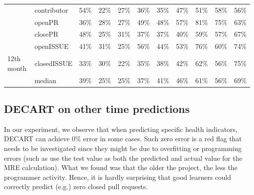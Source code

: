 \documentclass[smallextended]{svjour3}
\begin{document}
\begin{table}[!t]
{\begin{tabular}{llccccccccc}
                                     & contributor                          & \cellcolor[HTML]{B2B2B2}54\% & \cellcolor[HTML]{EBEBEB}22\% & \cellcolor[HTML]{E5E5E5}27\% & \cellcolor[HTML]{D8D8D8}36\% & \cellcolor[HTML]{D9D9D9}35\% & \cellcolor[HTML]{C6C6C6}47\% & \cellcolor[HTML]{BBBBBB}51\% & \cellcolor[HTML]{A8A8A8}58\% & \cellcolor[HTML]{AEAEAE}56\% \\
                                     & openPR                               & \cellcolor[HTML]{D9D9D9}36\% & \cellcolor[HTML]{E3E3E3}28\% & \cellcolor[HTML]{E5E5E5}27\% & \cellcolor[HTML]{BFBFBF}49\% & \cellcolor[HTML]{C2C2C2}48\% & \cellcolor[HTML]{ABABAB}57\% & \cellcolor[HTML]{6F6F6F}81\% & \cellcolor[HTML]{7D7D7D}75\% & \cellcolor[HTML]{9C9C9C}63\% \\
                                     & closePR                              & \cellcolor[HTML]{C3C3C3}48\% & \cellcolor[HTML]{E7E7E7}25\% & \cellcolor[HTML]{DEDEDE}31\% & \cellcolor[HTML]{D7D7D7}37\% & \cellcolor[HTML]{D6D6D6}37\% & \cellcolor[HTML]{D2D2D2}40\% & \cellcolor[HTML]{A7A7A7}59\% & \cellcolor[HTML]{ACACAC}57\% & \cellcolor[HTML]{929292}67\% \\
                                     & openISSUE                            & \cellcolor[HTML]{D1D1D1}41\% & \cellcolor[HTML]{DFDFDF}31\% & \cellcolor[HTML]{E7E7E7}25\% & \cellcolor[HTML]{AEAEAE}56\% & \cellcolor[HTML]{CDCDCD}44\% & \cellcolor[HTML]{B6B6B6}53\% & \cellcolor[HTML]{7B7B7B}76\% & \cellcolor[HTML]{A4A4A4}60\% & \cellcolor[HTML]{818181}74\% \\
\multirow{-6}{*}{12th month}         & closedISSUE                          & \cellcolor[HTML]{DCDCDC}33\% & \cellcolor[HTML]{E0E0E0}30\% & \cellcolor[HTML]{ECECEC}22\% & \cellcolor[HTML]{DADADA}35\% & \cellcolor[HTML]{D4D4D4}38\% & \cellcolor[HTML]{CFCFCF}42\% & \cellcolor[HTML]{9F9F9F}62\% & \cellcolor[HTML]{AFAFAF}56\% & \cellcolor[HTML]{7D7D7D}75\% \\ \hline
                                     & median                               & 39\%                         & 25\%                         & 25\%                         & 37\%                         & 41\%                         & 46\%                         & 61\%                         & 56\%                         & 69\%                        
\end{tabular}
 }
\end{table} 



\subsection{DECART on other time predictions}
\label{sect:other}
In our experiment, we observe that when predicting specific health indicators, DECART can achieve 0\% error in some cases. Such zero error is a red flag that needs to be investigated since they might be due to overfitting or programming errors (such as use the test value as both the predicted and actual value for the MRE calculation). What we found was that the older the project, the less the programmer activity.
  Hence,  it is hardly surprising that good learners could correctly predict (e.g.) zero closed pull requests.
\end{document}
